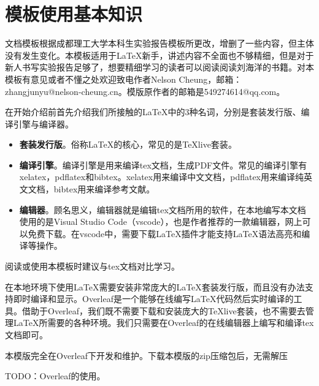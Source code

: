\section{模板使用基本知识}
文档模板根据成都理工大学本科生实验报告模板\cite{cdut_lab_report}所更改，增删了一些内容，但主体没有发生变化。本模板适用于\LaTeX  \cite{knuth1984texbook}新手，讲述内容不全面也不够精细，但是对于新人书写实验报告足够了，想要精细学习的读者可以阅读阅读刘海洋的书籍。对本模板有意见或者不懂之处欢迎致电作者Nelson Cheung，邮箱：zhangjunyu@nelson-cheung.cn。模版原作者的邮箱是549274614@qq.com。

在开始介绍前首先介绍我们所接触的\LaTeX 中的3种名词，分别是套装发行版、编译引擎与编译器。
\begin{itemize}
\item \textbf{套装发行版}。俗称\LaTeX 的核心，常见的是TeXlive套装\cite{texlive}。

\item \textbf{编译引擎}。编译引擎是用来编译tex文档，生成PDF文件。常见的编译引擎有xelatex，pdflatex和bibtex。xelatex用来编译中文文档，pdflatex用来编译纯英文文档，bibtex用来编译参考文献。
 
\item \textbf{编辑器}。顾名思义，编辑器就是编辑tex文档所用的软件，在本地编写本文档使用的是Visual Studio Code（vscode）\cite{vscode}，也是作者推荐的一款编辑器，网上可以免费下载。在vscode中，需要下载\LaTeX{}插件才能支持\LaTeX{}语法高亮和编译等操作。
\end{itemize}

阅读或使用本模板时建议与tex文档对比学习。

在本地环境下使用\LaTeX 需要安装非常庞大的\LaTeX 套装发行版，而且没有办法支持即时编译和显示。Overleaf\cite{overleaf}是一个能够在线编写\LaTeX{}代码然后实时编译的工具。借助于Overleaf，我们既不需要下载和安装庞大的TeXlive套装，也不需要去管理\LaTeX 所需要的各种环境。我们只需要在Overleaf的在线编辑器上编写和编译tex文档即可。

本模版完全在Overleaf下开发和维护。下载本模版的zip压缩包后，无需解压

TODO：Overleaf的使用。

